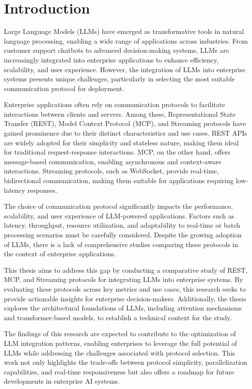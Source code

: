 \chapter{Introduction}
Large Language Models (LLMs) have emerged as transformative tools in natural language processing, enabling a wide range of applications across industries. From customer support chatbots to advanced decision-making systems, LLMs are increasingly integrated into enterprise applications to enhance efficiency, scalability, and user experience. However, the integration of LLMs into enterprise systems presents unique challenges, particularly in selecting the most suitable communication protocol for deployment.

Enterprise applications often rely on communication protocols to facilitate interactions between clients and servers. Among these, Representational State Transfer (REST), Model Context Protocol (MCP), and Streaming protocols have gained prominence due to their distinct characteristics and use cases. REST APIs are widely adopted for their simplicity and stateless nature, making them ideal for traditional request-response interactions. MCP, on the other hand, offers message-based communication, enabling asynchronous and context-aware interactions. Streaming protocols, such as WebSocket, provide real-time, bidirectional communication, making them suitable for applications requiring low-latency responses.

The choice of communication protocol significantly impacts the performance, scalability, and user experience of LLM-powered applications. Factors such as latency, throughput, resource utilization, and adaptability to real-time or batch processing scenarios must be carefully considered. Despite the growing adoption of LLMs, there is a lack of comprehensive studies comparing these protocols in the context of enterprise applications.

This thesis aims to address this gap by conducting a comparative study of REST, MCP, and Streaming protocols for integrating LLMs into enterprise systems. By evaluating these protocols across key metrics and use cases, this research seeks to provide actionable insights for enterprise decision-makers. Additionally, the thesis explores the architectural foundations of LLMs, including attention mechanisms and transformer-based models, to establish a technical context for the study.

The findings of this research are expected to contribute to the optimization of LLM integration patterns, enabling enterprises to leverage the full potential of LLMs while addressing the challenges associated with protocol selection. This work not only highlights the trade-offs between protocol simplicity, parallelization capabilities, and real-time responsiveness but also offers a roadmap for future developments in enterprise AI systems.

